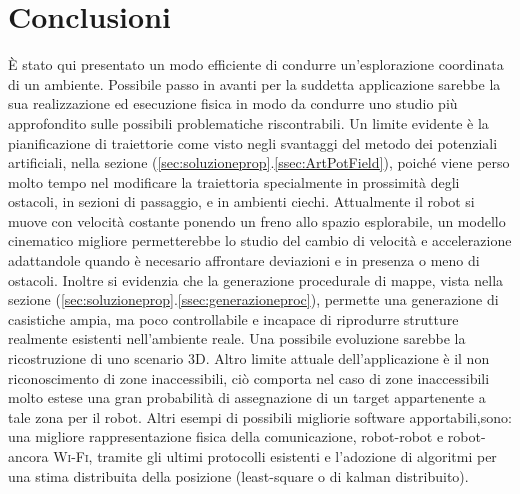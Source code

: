 \section{Conclusioni}
\label{sec:conclusioni}
È stato qui presentato un modo efficiente di condurre un'esplorazione coordinata
di un ambiente.
Possibile passo in avanti per la suddetta applicazione sarebbe la sua
realizzazione ed esecuzione fisica in modo da condurre uno studio più
approfondito sulle possibili problematiche riscontrabili.
Un limite evidente è la pianificazione di traiettorie come visto negli svantaggi
del metodo dei potenziali artificiali, nella sezione
(\ref{sec:soluzioneprop}.\ref{ssec:ArtPotField}), poiché viene perso molto tempo
nel modificare la traiettoria specialmente in prossimità degli ostacoli,
in sezioni di passaggio, e in ambienti ciechi.
Attualmente il robot si muove con velocità costante ponendo un freno allo spazio
esplorabile, un modello cinematico migliore permetterebbe lo studio del cambio
di velocità e accelerazione adattandole quando è necesario affrontare
deviazioni e in presenza o meno di ostacoli.
Inoltre si evidenzia che la generazione procedurale di mappe, vista nella
sezione (\ref{sec:soluzioneprop}.\ref{ssec:generazioneproc}), permette una
generazione di casistiche ampia, ma poco controllabile e incapace di riprodurre
strutture realmente esistenti nell'ambiente reale.
Una possibile evoluzione sarebbe la ricostruzione di uno scenario 3D.
Altro limite attuale dell'applicazione è il non riconoscimento di zone
inaccessibili, ciò comporta nel caso di zone inaccessibili molto estese una gran
probabilità di assegnazione di un target appartenente a tale zona per il robot.
Altri esempi di possibili migliorie software apportabili,sono: una migliore
rappresentazione fisica della comunicazione, robot-robot e robot-ancora
\textsc{Wi-Fi}, tramite gli ultimi protocolli esistenti e l'adozione di algoritmi 
per una stima distribuita della posizione (least-square o di kalman distribuito).


